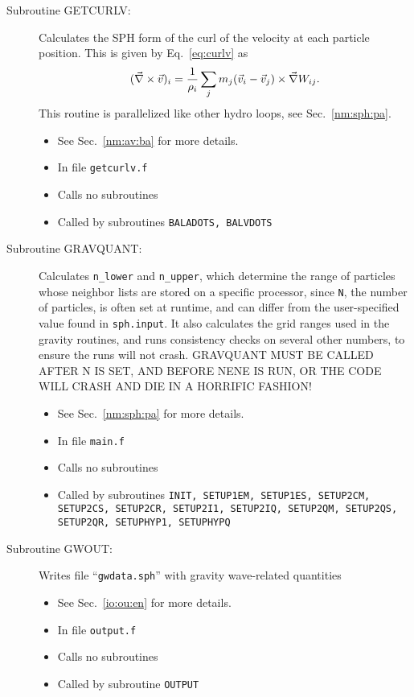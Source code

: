 \begin{description}
\item[Subroutine GETCURLV:] Calculates the SPH form of the curl of the 
velocity at each particle position. This is given by Eq.~\ref{eq:curlv}
as
\begin{equation}
(\vec{\nabla}\times \vec{v})_i={1 \over \rho_i}\sum_j m_j
        (\vec{v}_i-\vec{v}_j)\times\vec{\nabla} W_{ij}. 
\end{equation}
This routine is parallelized like other hydro loops, see Sec.~\ref{nm:sph:pa}.
\begin{itemize} 
\item See Sec.~\ref{nm:av:ba} for more details.
\item In file {\tt getcurlv.f}
\item Calls no subroutines
\item Called by subroutines {\tt BALADOTS, BALVDOTS}
\end{itemize}

\item[Subroutine GRAVQUANT:] Calculates {\tt n\_lower} and {\tt n\_upper},
which determine the range of particles whose neighbor lists are
stored on a specific processor, since {\tt N}, the number of particles,
is often set at runtime, and
can differ from the user-specified value found in {\tt sph.input}.
It also calculates the grid ranges used in the gravity routines, and
runs consistency checks on several other numbers, to
ensure the runs will not crash.  GRAVQUANT MUST BE CALLED AFTER N IS
SET, AND BEFORE NENE IS RUN, OR THE CODE WILL CRASH AND DIE IN A 
HORRIFIC FASHION!
\begin{itemize} 
\item See Sec.~\ref{nm:sph:pa} for more details.
\item In file {\tt main.f}
\item Calls no subroutines
\item Called by subroutines {\tt INIT, SETUP1EM, SETUP1ES, SETUP2CM, 
SETUP2CS, SETUP2CR, SETUP2I1, SETUP2IQ, SETUP2QM, SETUP2QS, SETUP2QR, 
SETUPHYP1, SETUPHYPQ}
\end{itemize}

\item[Subroutine GWOUT:] Writes file ``{\tt gwdata.sph}'' with 
gravity wave-related quantities
\begin{itemize} 
\item See Sec.~\ref{io:ou:en} for more details.
\item In file {\tt output.f}
\item Calls no subroutines 
\item Called by subroutine {\tt OUTPUT}
\end{itemize}


\end{description}
